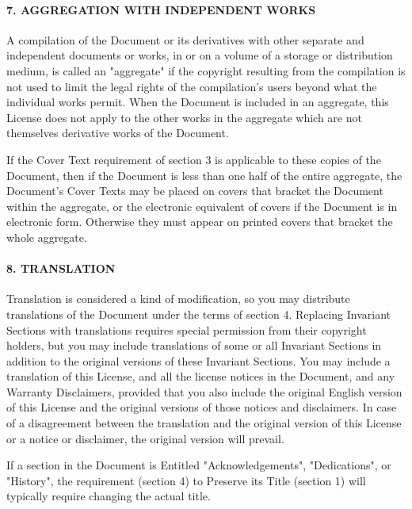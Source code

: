 \hypertarget{7-aggregation-with-independent-works}{%
\paragraph{7. AGGREGATION WITH INDEPENDENT
WORKS}\label{7-aggregation-with-independent-works}}

A compilation of the Document or its derivatives with other separate and
independent documents or works, in or on a volume of a storage or
distribution medium, is called an "aggregate" if the copyright resulting
from the compilation is not used to limit the legal rights of the
compilation's users beyond what the individual works permit. When the
Document is included in an aggregate, this License does not apply to the
other works in the aggregate which are not themselves derivative works
of the Document.

If the Cover Text requirement of section 3 is applicable to these copies
of the Document, then if the Document is less than one half of the
entire aggregate, the Document's Cover Texts may be placed on covers
that bracket the Document within the aggregate, or the electronic
equivalent of covers if the Document is in electronic form. Otherwise
they must appear on printed covers that bracket the whole aggregate.

\hypertarget{8-translation}{%
\paragraph{8. TRANSLATION}\label{8-translation}}

Translation is considered a kind of modification, so you may distribute
translations of the Document under the terms of section 4. Replacing
Invariant Sections with translations requires special permission from
their copyright holders, but you may include translations of some or all
Invariant Sections in addition to the original versions of these
Invariant Sections. You may include a translation of this License, and
all the license notices in the Document, and any Warranty Disclaimers,
provided that you also include the original English version of this
License and the original versions of those notices and disclaimers. In
case of a disagreement between the translation and the original version
of this License or a notice or disclaimer, the original version will
prevail.

If a section in the Document is Entitled "Acknowledgements",
"Dedications", or "History", the requirement (section 4) to Preserve its
Title (section 1) will typically require changing the actual title.

